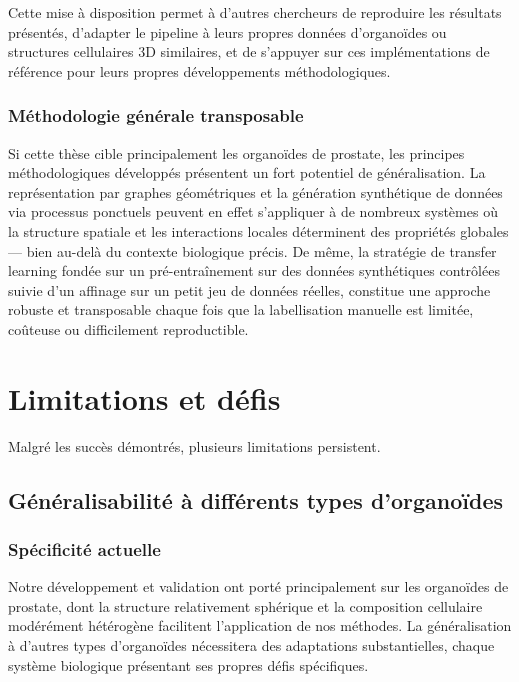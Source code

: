 Cette mise à disposition permet à d'autres chercheurs de reproduire les résultats présentés, d'adapter le pipeline à leurs propres données d'organoïdes ou structures cellulaires 3D similaires, et de s'appuyer sur ces implémentations de référence pour leurs propres développements méthodologiques.

\subsubsection{Méthodologie générale transposable}
Si cette thèse cible principalement les organoïdes de prostate, les principes méthodologiques développés présentent un fort potentiel de généralisation. La représentation par graphes géométriques et la génération synthétique de données via processus ponctuels peuvent en effet s'appliquer à de nombreux systèmes où la structure spatiale et les interactions locales déterminent des propriétés globales — bien au-delà du contexte biologique précis. De même, la stratégie de transfer learning fondée sur un pré-entraînement sur des données synthétiques contrôlées suivie d'un affinage sur un petit jeu de données réelles, constitue une approche robuste et transposable chaque fois que la labellisation manuelle est limitée, coûteuse ou difficilement reproductible.

\section{Limitations et défis}

Malgré les succès démontrés, plusieurs limitations persistent.

\subsection{Généralisabilité à différents types d'organoïdes}

\subsubsection{Spécificité actuelle}

Notre développement et validation ont porté principalement sur les organoïdes de prostate, dont la structure relativement sphérique et la composition cellulaire modérément hétérogène facilitent l'application de nos méthodes. La généralisation à d'autres types d'organoïdes nécessitera des adaptations substantielles, chaque système biologique présentant ses propres défis spécifiques.

